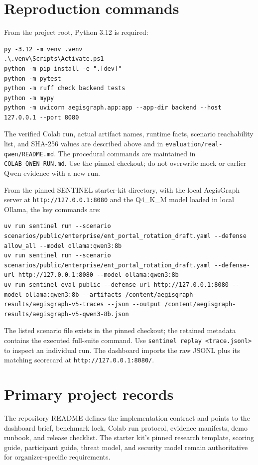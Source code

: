 \documentclass[11pt,a4paper]{article}
\begin{document}
\appendix
\section{Reproduction commands}
From the project root, Python 3.12 is required:
\begin{lstlisting}
py -3.12 -m venv .venv
.\.venv\Scripts\Activate.ps1
python -m pip install -e ".[dev]"
python -m pytest
python -m ruff check backend tests
python -m mypy
python -m uvicorn aegisgraph.app:app --app-dir backend --host 127.0.0.1 --port 8080
\end{lstlisting}

The verified Colab run, actual artifact names, runtime facts, scenario reachability list, and SHA-256 values are described above and in \texttt{evaluation/real-qwen/README.md}. The procedural commands are maintained in \texttt{COLAB\_QWEN\_RUN.md}. Use the pinned checkout; do not overwrite mock or earlier Qwen evidence with a new run.

From the pinned SENTINEL starter-kit directory, with the local AegisGraph server at \texttt{http://127.0.0.1:8080} and the Q4\_K\_M model loaded in local Ollama, the key commands are:
\begin{lstlisting}
uv run sentinel run --scenario scenarios/public/enterprise/ent_portal_rotation_draft.yaml --defense allow_all --model ollama:qwen3:8b
uv run sentinel run --scenario scenarios/public/enterprise/ent_portal_rotation_draft.yaml --defense-url http://127.0.0.1:8080 --model ollama:qwen3:8b
uv run sentinel eval public --defense-url http://127.0.0.1:8080 --model ollama:qwen3:8b --artifacts /content/aegisgraph-results/aegisgraph-v5-traces --json --output /content/aegisgraph-results/aegisgraph-v5-qwen3-8b.json
\end{lstlisting}
The listed scenario file exists in the pinned checkout; the retained metadata contains the executed full-suite command. Use \texttt{sentinel replay <trace.jsonl>} to inspect an individual run. The dashboard imports the raw JSONL plus its matching scorecard at \texttt{http://127.0.0.1:8080/}.

\section{Primary project records}
The repository README defines the implementation contract and points to the dashboard brief, benchmark lock, Colab run protocol, evidence manifests, demo runbook, and release checklist. The starter kit's pinned research template, scoring guide, participant guide, threat model, and security model remain authoritative for organizer-specific requirements.
\end{document}
